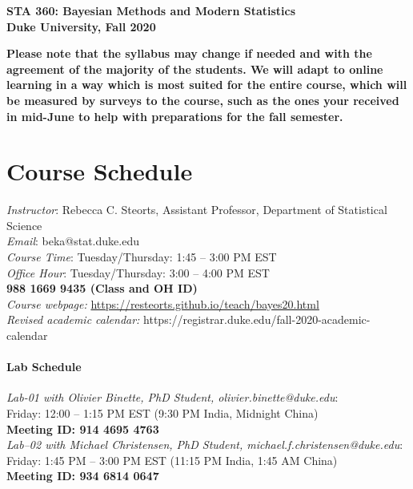 \documentclass[11pt]{article}
\date{}
\begin{document}
\begin{center}
{\Large\bf STA 360: Bayesian Methods and Modern Statistics} \\

{\Large\bf Duke University, Fall 2020} \\
\end{center}

\textbf{Please note that the syllabus may change if needed and with the agreement of the majority of the students. We will adapt to online learning in a way which is most suited for the entire course, which will be measured by surveys to the course, such as the ones your received in mid-June to help with preparations for the fall semester.} \\

\section{Course Schedule}
\emph{Instructor}: Rebecca C. Steorts,  Assistant Professor,  Department of Statistical Science\\
\emph{Email}: beka@stat.duke.edu\\
\emph{Course Time}: Tuesday/Thursday: 1:45 -- 3:00 PM EST \\
\emph{Office Hour}: Tuesday/Thursday: 3:00 -- 4:00 PM EST \\
\textbf{988 1669 9435 (Class and OH ID)}\\
\emph{Course webpage:} \url{https://resteorts.github.io/teach/bayes20.html} \\
\emph{Revised academic calendar:} https://registrar.duke.edu/fall-2020-academic-calendar


\paragraph{Lab Schedule}
\emph{Lab-01 with Olivier Binette, PhD Student, olivier.binette@duke.edu}: \\Friday: 12:00 -- 1:15 PM EST (9:30 PM India, Midnight China)\\
\textbf{Meeting ID: 914 4695 4763}\\
\emph{Lab--02 with Michael Christensen, PhD Student, michael.f.christensen@duke.edu}: \\Friday: 1:45 PM -- 3:00 PM EST (11:15 PM India, 1:45 AM China)\\
\textbf{Meeting ID: 934 6814 0647}
\end{document}
